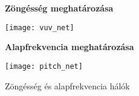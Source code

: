 \begin{figure}[h]
\begin{minipage}{0.45\textwidth}
	\begin{center}
		\textbf{Zöngésség meghatározása}\par\medskip
		\texttt{[image: vuv\_net]}
	\end{center}
\end{minipage}
\begin{minipage}{0.45\textwidth}
	\begin{center}
		\textbf{Alapfrekvencia meghatározása}\par\medskip
		\texttt{[image: pitch\_net]}
	\end{center}
\end{minipage}
\caption{Zöngésség és alapfrekvencia hálók}
\end{figure}
\begin{comment}
regi reszek

A továbbiakban egy DNN modell alkalmazása olvasható. A megismert címkéket továbbiakkal egészítettük ki, majd ez alapján generáltunk gerjesztési és spektrális paramétereket, amikből előállítható az audio.





Előrecsatolt mély neurális hálózatot építettünk fel, 6 rejtett réteggel, tanh és sigmoid aktivációs függvényekkel, SGD optimalizálóval és MSE költségfüggvénnyel. A háló rétegeire Dropoutot is használtunk. (/!TODO ref)
A megállást early stoppinggal detektáltuk.

/!TODO háló modell kép

\end{comment}
